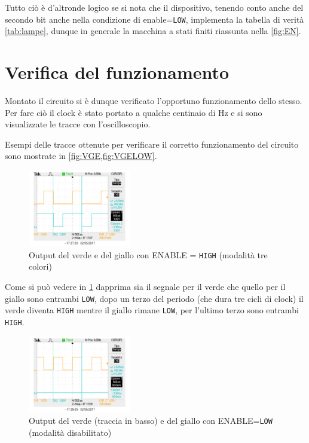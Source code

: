 \documentclass[a4paper,10pt]{article}
\def\code#1{\texttt{#1}}
\begin{document}
Tutto ciò è d'altronde logico se si nota che il dispositivo, tenendo conto anche del secondo bit anche nella condizione di enable=\code{LOW}, implementa la tabella di verità \cref{tab:lampe}, dunque in generale la macchina a stati finiti riassunta nella \cref{fig:EN}.



\section{Verifica del funzionamento}

Montato il circuito si è dunque verificato l'opportuno funzionamento dello stesso. Per fare ciò il clock è stato portato a qualche centinaio di Hz e si sono visualizzate le tracce con l'oscilloscopio.

Esempi delle tracce ottenute per verificare il corretto funzionamento del circuito sono mostrate in \cref{fig:VGE,fig:VGELOW}.


\begin{figure}[H]
	\centering
	\includegraphics[width=0.4\textwidth]{../grafici/verde_giallo.png}
	\caption{Output del verde e del giallo con ENABLE = \code{HIGH} (modalità tre colori)}
	\label{fig:VGE}
\end{figure}

Come si può vedere in \cref{fig:VGE} dapprima sia il segnale per il verde che quello per il giallo sono entrambi \code{LOW}, dopo un terzo del periodo (che dura tre cicli di clock) il verde diventa \code{HIGH} mentre il giallo rimane \code{LOW}, per l'ultimo terzo sono entrambi \code{HIGH}.



\begin{figure}[H]
	\centering
	\includegraphics[width=0.4\textwidth]{../grafici/verde_gialloELOW.png}
	\caption{Output del verde (traccia in basso) e del giallo con ENABLE=\code{LOW} (modalità disabilitato)}
	\label{fig:VGELOW}
\end{figure}
\end{document}
